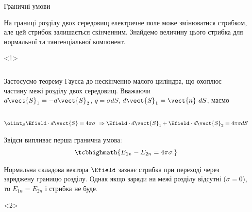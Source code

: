 \documentclass{beamer}
\begin{document}
\begin{frame}{Граничні умови}{}
	\begin{block}{}\justifying
        На границі розділу двох середовищ електричне поле може змінюватися стрибком, але цей стрибок залишається
        скінченним. Знайдемо величину цього стрибка для \alert<1>{нормальної} та \alert<2>{тангенціальної} компонент.
	\end{block}
	\begin{onlyenv}
		\begin{columns}
			\begin{column}{0.6\linewidth}
				\begin{block}{}\small\justifying
					Застосуємо теорему Гаусса до нескінченно малого циліндра, що охоплює частину межі
					розділу двох
					середовищ. Вважаючи $d\vect{S}_1 = - d\vect{S}_2$, $q = \sigma dS$,
					$d\vect{S}_1 =
						\vect{n}\ dS$,
					маємо
				\end{block}
			\end{column}
			\begin{column}{0.4\linewidth}\centering
				
			\end{column}
		\end{columns}
		\begin{block}{}\small
			\begin{equation*}
				\oiint_S \Efield\cdot d\vect{S} = 4\pi\sigma\ \Rightarrow  \Efield\cdot
				d\vect{S}_1 +
				\Efield\cdot d\vect{S}_2 = 4\pi\sigma dS
			\end{equation*}
		\end{block}
		\begin{block}{}
			Звідси випливає перша гранична умова:
			\begin{equation*}
				\tcbhighmath{
					E_{1n} - E_{2n} = 4\pi\sigma.
				}
			\end{equation*}
		\end{block}
		\begin{alertblock}{}\justifying\small
			Нормальна складова вектора $\Efield$ зазнає стрибка при
			переході через заряджену границю розділу. Однак якщо заряди на межі розділу відсутні
			($\sigma =
				0$), то $E_{1n} = E_{2n}$ і стрибка не буде.
		\end{alertblock}
	\end{onlyenv}
	\begin{onlyenv}
		\begin{columns}
			\begin{column}{0.6\linewidth}

\end{column}
\end{columns}
\end{onlyenv}
\end{frame}
\end{document}
